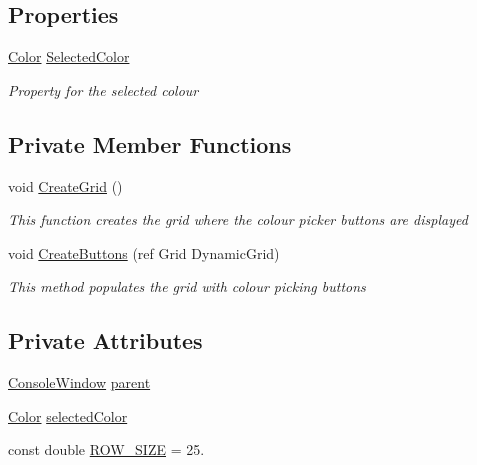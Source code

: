 \subsection*{Properties}
\begin{DoxyCompactItemize}
\item 
\hyperlink{_console_window_8xaml_8cs_adf2800823d988ace598d734fdec29975}{Color} \hyperlink{class_c_p_u___o_s___simulator_1_1_colour_picker_window_a4e51070f2e58d178bf773acb4200e76e}{Selected\+Color}
\begin{DoxyCompactList}\small\item\em Property for the selected colour \end{DoxyCompactList}\end{DoxyCompactItemize}
\subsection*{Private Member Functions}
\begin{DoxyCompactItemize}
\item 
void \hyperlink{class_c_p_u___o_s___simulator_1_1_colour_picker_window_aed4e40744fb046fb84cebd2c406b8a99}{Create\+Grid} ()
\begin{DoxyCompactList}\small\item\em This function creates the grid where the colour picker buttons are displayed \end{DoxyCompactList}\item 
void \hyperlink{class_c_p_u___o_s___simulator_1_1_colour_picker_window_a2969d055fb398db5c470dd91d89abffd}{Create\+Buttons} (ref Grid Dynamic\+Grid)
\begin{DoxyCompactList}\small\item\em This method populates the grid with colour picking buttons \end{DoxyCompactList}\end{DoxyCompactItemize}
\subsection*{Private Attributes}
\begin{DoxyCompactItemize}
\item 
\hyperlink{class_c_p_u___o_s___simulator_1_1_console_window}{Console\+Window} \hyperlink{class_c_p_u___o_s___simulator_1_1_colour_picker_window_a0a40b478316b3e45a63c67347ff9fc63}{parent}
\item 
\hyperlink{_console_window_8xaml_8cs_adf2800823d988ace598d734fdec29975}{Color} \hyperlink{class_c_p_u___o_s___simulator_1_1_colour_picker_window_a1c1653bebad209bd313da5a18ecea9bc}{selected\+Color}
\item 
const double \hyperlink{class_c_p_u___o_s___simulator_1_1_colour_picker_window_a82dedb596267fba0813f7d710d96e6af}{R\+O\+W\+\_\+\+S\+I\+Z\+E} = 25.
\end{DoxyCompactItemize}


